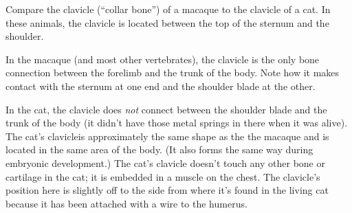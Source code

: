 \documentclass[12pt, hidelinks]{exam}
\newcommand*\AnswerBox[2]{%
    \parbox[t][#1]{0.92\textwidth}{%
    \begin{solution}#2\end{solution}}
    \vspace{\stretch{1}}
}
\begin{document}
\begin{questions}

\question
Compare the clavicle (``collar bone'') of a macaque to the clavicle of a cat. In these animals, the clavicle is located between the top of the sternum and the shoulder.


In the macaque (and most other vertebrates), the clavicle is the only bone connection between
the forelimb and the trunk of the body. Note how it makes contact with
the sternum at one end and the shoulder blade at the other. 

In the cat, the clavicle does \emph{not} connect between the shoulder blade and the trunk of
the body (it didn't have those metal springs in there when it was
alive). %
The cat's clavicleis approximately the same shape as the
the macaque and is located in the same area of the body. (It also forms
the same way during embryonic development.) The cat's clavicle doesn't touch
any other bone or cartilage in the cat; it is embedded in a muscle on the
chest. The clavicle's position here is slightly off to the side from where it's
found in the living cat because it has been attached with a wire to the
humerus.

\end{questions}
\end{document}

